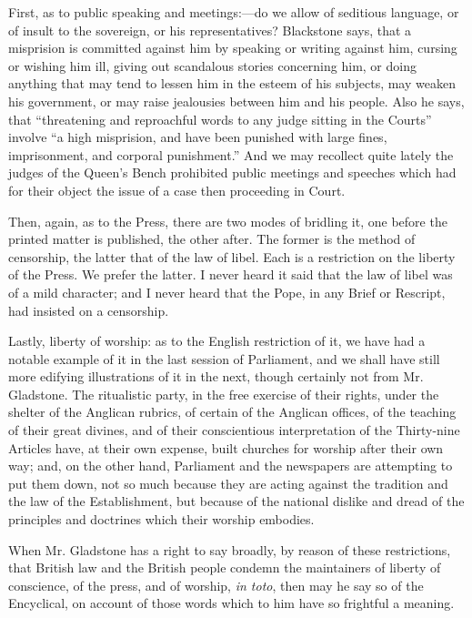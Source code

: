 First, as to public speaking and meetings:—do we allow of seditious
language, or of insult to the sovereign, or his representatives?
Blackstone says, that a misprision is committed against him by speaking
or writing against him, cursing or wishing him ill, giving out
scandalous stories concerning him, or doing anything that may tend to
lessen him in the esteem of his subjects, may weaken his government, or
may raise jealousies between him and his people. Also he says, that
``threatening and reproachful words to any judge sitting in the
Courts'' involve ``a high misprision, and have been punished
with large fines, imprisonment, and corporal punishment.'' And we
may recollect quite lately the judges of the Queen's Bench prohibited
public meetings and speeches which had for their object the issue of a
case then proceeding in Court.

Then, again, as to the Press, there are two modes of bridling it, one
before the printed matter is published, the other after. The former is
the method of censorship, the latter that of the law of libel. Each is a
restriction on the liberty of the Press. We prefer the latter. I never
heard it said that the law of libel was of a mild character; and I never
heard that the Pope, in any Brief or Rescript, had insisted on a
censorship.

Lastly, liberty of worship: as to the English restriction of it, we
have had a notable example of it in the last session of Parliament, and
we shall have still more edifying illustrations of it in the next,
though certainly not from Mr. Gladstone. The ritualistic party, in the
free exercise of their rights, under the shelter of the Anglican
rubrics, of certain of the Anglican offices, of the teaching of their
great divines, and of their conscientious interpretation of the
Thirty-nine Articles have, at their own expense, built churches for
worship after their own way; and, on the other hand, Parliament
and the newspapers are attempting to put them down, not so much because
they are acting against the tradition and the law of the Establishment,
but because of the national dislike and dread of the principles and
doctrines which their worship embodies.

When Mr. Gladstone has a right to say broadly, by reason of these
restrictions, that British law and the British people condemn the
maintainers of liberty of conscience, of the press, and of worship, \emph{in
toto}, then may he say so of the Encyclical, on account of those
words which to him have so frightful a meaning.

